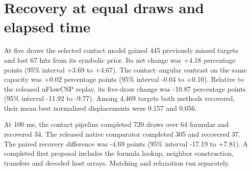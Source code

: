 \clearpage\section{Recovery at equal draws and elapsed time}

At five draws the selected contact model gained 445 previously missed targets and lost 67 hits from its symbolic prior. Its net change was +4.18 percentage points (95\% interval +3.69 to +4.67). The contact--angular contrast on the same capacity was +0.02 percentage points (95\% interval -0.04 to +0.10). Relative to the released uFlowCSP replay, its five-draw change was -10.87 percentage points (95\% interval -11.92 to -9.77). Among 4,469 targets both methods recovered, their mean best normalized displacements were 0.157 and 0.056.

At 100 ms, the contact pipeline completed 720 draws over 64 formulas and recovered 34. The released native comparator completed 305 and recovered 37. The paired recovery difference was -4.69 points (95\% interval -17.19 to +7.81). A completed first proposal includes the formula lookup, neighbor construction, transfers and decoded host arrays. Matching and relaxation run separately.

